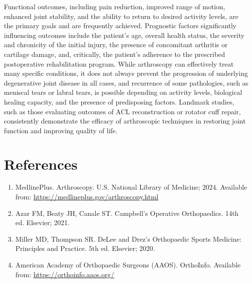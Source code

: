 Functional outcomes, including pain reduction, improved range of motion, enhanced joint stability, and the ability to return to desired activity levels, are the primary goals and are frequently achieved. Prognostic factors significantly influencing outcomes include the patient's age, overall health status, the severity and chronicity of the initial injury, the presence of concomitant arthritis or cartilage damage, and, critically, the patient's adherence to the prescribed postoperative rehabilitation program. While arthroscopy can effectively treat many specific conditions, it does not always prevent the progression of underlying degenerative joint disease in all cases, and recurrence of some pathologies, such as meniscal tears or labral tears, is possible depending on activity levels, biological healing capacity, and the presence of predisposing factors. Landmark studies, such as those evaluating outcomes of ACL reconstruction or rotator cuff repair, consistently demonstrate the efficacy of arthroscopic techniques in restoring joint function and improving quality of life.

\section*{References}
\begin{enumerate}
  \item MedlinePlus. Arthroscopy. U.S. National Library of Medicine; 2024. Available from: \url{https://medlineplus.gov/arthroscopy.html}
  \item Azar FM, Beaty JH, Canale ST. Campbell's Operative Orthopaedics. 14th ed. Elsevier; 2021.
  \item Miller MD, Thompson SR. DeLee and Drez's Orthopaedic Sports Medicine: Principles and Practice. 5th ed. Elsevier; 2020.
  \item American Academy of Orthopaedic Surgeons (AAOS). OrthoInfo. Available from: \url{https://orthoinfo.aaos.org/}
\end{enumerate}

\clearpage
